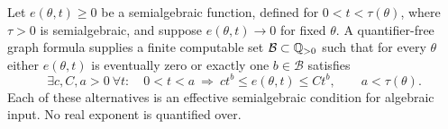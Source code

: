 \begin{lemma}\label{lem:support-order}
Let $e(\theta,t)\ge0$ be a semialgebraic function, defined for
$0<t<\tau(\theta)$, where $\tau>0$ is semialgebraic, and suppose
$e(\theta,t)\to0$ for fixed $\theta$. A quantifier-free graph formula
supplies a finite computable set $\mathcal B\subset\mathbb Q_{>0}$ such that
for every $\theta$ either $e(\theta,t)$ is eventually zero or exactly
one $b\in\mathcal B$ satisfies
\begin{equation}\label{eq:order-decision}
 \exists c,C,a>0\ \forall t:\quad
 0<t<a\ \Longrightarrow\ c t^b\le e(\theta,t)\le C t^b,
 \qquad a<\tau(\theta).
\end{equation}
Each of these alternatives is an effective semialgebraic condition for
algebraic input. No real exponent is quantified over.
\end{lemma}
